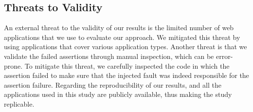 \subsection{Threats to Validity} \label{threatsToValidity}

An external threat to the validity of our results is the limited number of web applications that we use to evaluate our approach. 
We mitigated this threat by using \javascript applications that cover various application types.
Another threat is that we validate the failed assertions through manual inspection,  which can be error-prone. To mitigate this threat, we carefully inspected the code in which the assertion failed to make sure that the injected fault was indeed responsible for the assertion failure. %
Regarding the reproducibility of our results, \tool and all the applications used in this study are publicly available, thus making the study replicable.
